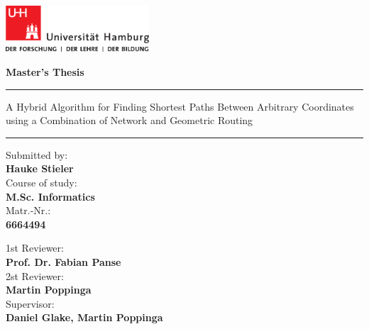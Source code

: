 
\pagenumbering{}

\begin{titlepage}
	
	\includegraphics[width=0.4\textwidth]{images/UHH-Logo_2010_Farbe_CMYK.pdf}
	\vspace{1cm}
	
	\begin{center}
		
		{
			\Large
			\textbf{Master's Thesis}
			\par
		}
		
		\vspace{1.5cm}
		\hrule
		\vspace{1cm}
		
		{
			\titlefont
			\huge
			A Hybrid Algorithm for Finding Shortest Paths Between Arbitrary Coordinates using a Combination of Network and Geometric Routing
			\par
		}
		
		\vspace{1cm}
		\hrule
		\vspace{1.5cm}
	\end{center}
	
	\begin{multicols}{2}
		\raggedright
		Submitted by:\\
		\textbf{Hauke Stieler}\\[1ex]
		Course of study:\\
		\textbf{M.Sc. Informatics}\\[1ex]
		Matr.-Nr.:\\
		\textbf{6664494}
		
		\columnbreak
		\raggedleft
		
		1st Reviewer:\\
		\textbf{Prof. Dr. Fabian Panse}\\[1ex]
		2st Reviewer:\\
		\textbf{Martin Poppinga}\\[1ex]
		Supervisor:\\
		\textbf{Daniel Glake, Martin Poppinga}
	\end{multicols}


\end{titlepage}

